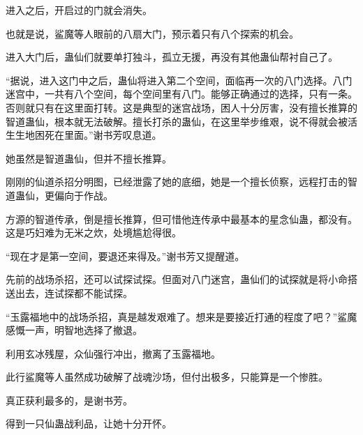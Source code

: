 \begin{this_body}
进入之后，开启过的门就会消失。

也就是说，鲨魔等人眼前的八扇大门，预示着只有八个探索的机会。

进入大门后，蛊仙们就要单打独斗，孤立无援，再没有其他蛊仙帮衬自己了。

“据说，进入这门中之后，蛊仙将进入第二个空间，面临再一次的八门选择。八门迷宫中，一共有八个空间，每个空间里有八门。能够正确通过的选择，只有一条。否则就只有在这里面打转。这是典型的迷宫战场，困人十分厉害，没有擅长推算的智道蛊仙，根本就无法破解。擅长打杀的蛊仙，在这里举步维艰，说不得就会被活生生地困死在里面。”谢书芳叹息道。

她虽然是智道蛊仙，但并不擅长推算。

刚刚的仙道杀招分明图，已经泄露了她的底细，她是一个擅长侦察，远程打击的智道蛊仙，更偏向于作战。

方源的智道传承，倒是擅长推算，但可惜他连传承中最基本的星念仙蛊，都没有。这是巧妇难为无米之炊，处境尴尬得很。

“现在才是第一空间，要退还来得及。”谢书芳又提醒道。

先前的战场杀招，还可以试探试探。但面对八门迷宫，蛊仙们的试探就是将小命搭送出去，连试探都不能试探。

“玉露福地中的战场杀招，真是越发艰难了。想来是要接近打通的程度了吧？”鲨魔感慨一声，明智地选择了撤退。

利用玄冰残屋，众仙强行冲出，撤离了玉露福地。

此行鲨魔等人虽然成功破解了战魂沙场，但付出极多，只能算是一个惨胜。

真正获利最多的，是谢书芳。

得到一只仙蛊战利品，让她十分开怀。

\end{this_body}

